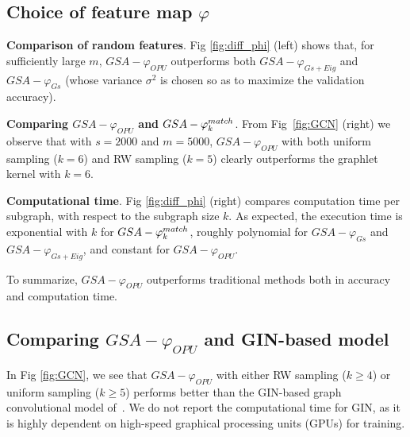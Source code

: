 \documentclass{article}
\begin{document}
\subsection{Choice of feature map $\varphi$}
\textbf{Comparison of random features}. Fig \ref{fig:diff_phi} (left) shows  that, for sufficiently large $m$, $GSA-\varphi_{OPU}$  outperforms both $GSA-\varphi_{Gs+Eig}$  and $GSA-\varphi_{Gs}$ (whose variance $\sigma^2$ is chosen so as to maximize the validation accuracy). %

\noindent\textbf{Comparing $GSA-\varphi_{OPU}$ and $GSA-\varphi^{match}_k$}. From Fig~\ref{fig:GCN} (right) we observe that with $s=2000$ and $m=5000$, $GSA-\varphi_{OPU}$ with both uniform sampling ($k=6$) and RW sampling ($k=5$)  clearly outperforms the graphlet kernel %
with $k=6$. %

\noindent\textbf{Computational time}. Fig \ref{fig:diff_phi} (right) compares computation time per subgraph, with respect to the subgraph size $k$. %
As expected, the execution time is exponential with $k$ for $GSA-\varphi^{match}_k$, roughly polynomial for $GSA-\varphi_{Gs}$ and $GSA-\varphi_{Gs+Eig}$, and constant for $GSA-\varphi_{OPU}$.%

To summarize, $GSA-\varphi_{OPU}$ outperforms traditional methods both in accuracy and computation time.

\subsection{Comparing $GSA-\varphi_{OPU}$ and GIN-based model}\label{sec:vs_GIN}

In Fig \ref{fig:GCN}, we see that $GSA-\varphi_{OPU}$ with either RW sampling  ($k\geq4$) or uniform sampling ($k\geq5$) performs better than the GIN-based graph convolutional model of~\cite{GCN_powerful}. We do not report the computational time for GIN, as it is highly dependent on high-speed graphical processing units (GPUs) for training.
\end{document}
